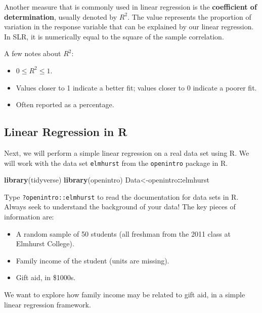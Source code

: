 \documentclass[
]{book}
\newenvironment{Shaded}{\begin{snugshade}}{\end{snugshade}}
\newcommand{\FunctionTok}[1]{\textcolor[rgb]{0.13,0.29,0.53}{\textbf{#1}}}
\newcommand{\NormalTok}[1]{#1}
\newcommand{\OtherTok}[1]{\textcolor[rgb]{0.56,0.35,0.01}{#1}}
\newcommand{\SpecialCharTok}[1]{\textcolor[rgb]{0.81,0.36,0.00}{\textbf{#1}}}
\providecommand{\tightlist}{%
  \setlength{\itemsep}{0pt}\setlength{\parskip}{0pt}}
\begin{document}
Another measure that is commonly used in linear regression is the \textbf{coefficient of determination}, usually denoted by \(R^2\). The value represents the proportion of variation in the response variable that can be explained by our linear regression. In SLR, it is numerically equal to the square of the sample correlation.

A few notes about \(R^2\):

\begin{itemize}
\tightlist
\item
  \(0 \leq R^2 \leq 1\).
\item
  Values closer to 1 indicate a better fit; values closer to 0 indicate a poorer fit.
\item
  Often reported as a percentage.
\end{itemize}

\hypertarget{linear-regression-in-r}{%
\subsection{Linear Regression in R}\label{linear-regression-in-r}}

Next, we will perform a simple linear regression on a real data set using R. We will work with the data set \texttt{elmhurst} from the \texttt{openintro} package in R.

\begin{Shaded}
\begin{Highlighting}[]
\FunctionTok{library}\NormalTok{(tidyverse)}
\FunctionTok{library}\NormalTok{(openintro)}
\NormalTok{Data}\OtherTok{\textless{}{-}}\NormalTok{openintro}\SpecialCharTok{::}\NormalTok{elmhurst}
\end{Highlighting}
\end{Shaded}

Type \texttt{?openintro::elmhurst} to read the documentation for data sets in R. Always seek to understand the background of your data! The key pieces of information are:

\begin{itemize}
\tightlist
\item
  A random sample of 50 students (all freshman from the 2011 class at Elmhurst College).
\item
  Family income of the student (units are missing).
\item
  Gift aid, in \$1000s.
\end{itemize}

We want to explore how family income may be related to gift aid, in a simple linear regression framework.
\end{document}

